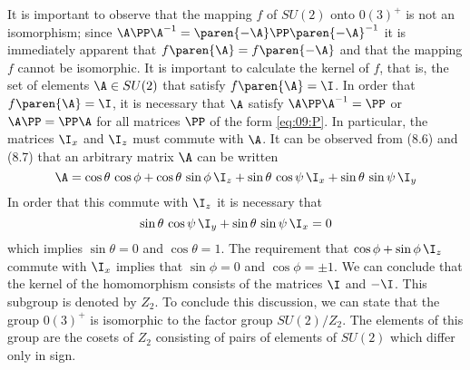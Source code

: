 It is important to observe that the mapping $f$ of $SU(2)$ onto $0(3)^{+}$ is not an isomorphism; since $\A \PP \A^{-1} = \paren{-\A}  \PP \paren{-\A} ^{-1}$ it is immediately apparent that $f\paren{\A} = f\paren{-\A}$ and that the mapping $f$ cannot be isomorphic. It is important to calculate the kernel of $f$, that is, the set of elements	$\A \in SU(2)$ that satisfy $f\paren{\A} = \I$. In order that $f\paren{\A} = \I$, it is necessary that $\A$ satisfy $\A \PP \A^{-1} = \PP$ or $\A\PP = \PP\A$ for all matrices $\PP$ of the form \eqref{eq:09:P}. In particular, the matrices $\I_{x}$ and $\I_{z}$ must commute with $\A$. It can be observed from (8.6) and (8.7) that an arbitrary matrix $\A$ can be written 
\begin{equation*}
  \A =
  \cos \theta \, \cos \phi + 
  \cos \theta \, \sin \phi \, \I_{z} + 
  \sin \theta \, \cos \psi \, \I_{x} +
  \sin \theta \, \sin \psi \, \I_{y}
\end{equation*}
In order that this commute with $\I_{z}$ it is necessary that
\begin{equation}
  \sin \theta \, \cos \psi \, \I_{y} + \sin \theta \, \sin \psi \, \I_{x} = 0
\end{equation}
which implies $\sin \theta = 0$ and $\cos \theta = 1$. The requirement that $\cos \phi + \sin \phi \, \I_{z}$ commute with $\I_{x}$ implies that $\sin \phi = 0$ and $\cos \phi = \pm1$. We can conclude that the kernel of the homomorphism consists of the matrices $\I$ and $-\I$. This subgroup is denoted by $Z_{2}$. To conclude this discussion, we can state that the group $0(3)^{+}$ is isomorphic to the factor group $SU(2)/Z_{2}$.	The elements of this group are the cosets of $Z_{2}$ consisting of pairs of elements of $SU(2)$ which differ only in sign.

\endinput